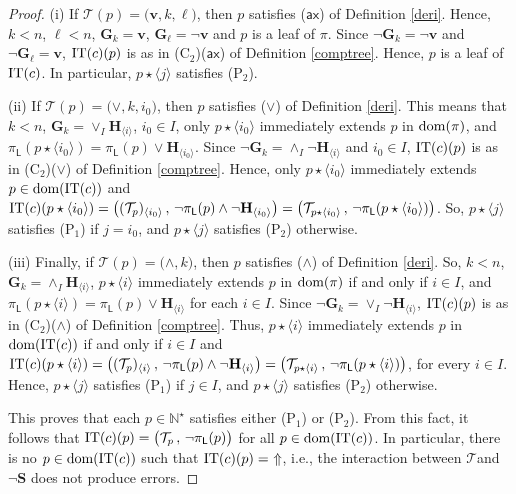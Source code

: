 \documentclass[copyright,creativecommons]{eptcs}
\def\ie{i.e., }
\newcommand{\vv}{\langle}
\newcommand{\ww}{\rangle}
\newcommand{\NN}{\mathbb{N}}
\newcommand{\axi}{\mathsf{ax}}
\newcommand{\cT}{\mathcal{T}}
\newcommand{\Dis}[1]{\big( #1 \big)}
\newcommand{\arppp}[2]{\textstyle\vee_{#2} \bH_{#1}}
\newcommand{\arnnn}[2]{\textstyle\wedge_{#2} \bH_{#1}}
\newcommand{\bG}{\mathbf{G}}
\newcommand{\bH}{\mathbf{H}}
\newcommand{\bS}{\mathbf{S}}
\newcommand{\bbv}{\mathbf{v}}
\newcommand{\dom}{\ensuremath{\textnormal{dom}}}
\newcommand{\CT}{\textnormal{IT}}
\newcommand{\sL}{\mathsf{L}}
\theoremstyle{definition}
\begin{document}
\begin{proof}
(i) If  $\cT(p) = \Dis{\bbv , k , \ell}$,
then $p$ satisfies
 ($\axi$) of Definition
\ref{deri}.
 Hence, $k<n$, $\ell < n$,
 $ \bG_k = \bbv$,
 $\bG_\ell = \neg \bbv$ and
  $p$ is a leaf of $\pi$. Since  $\neg \bG_k = \neg \bbv$ and
 $\neg \bG_\ell = \bbv$,   $\CT(c)(p)$
is as in (C$_2$)($\axi$)
 of Definition \ref{comptree}.  Hence,
$p$ is  a  leaf of
  $\CT(c)$. In particular,
$p \star \vv j \ww$ satisfies (P$_2$).



(ii) If $\cT(p) = \Dis{\vee , k , i_0}$, then  $p$
satisfies   ($\vee$) of Definition
\ref{deri}. This means that $ k < n$,
 $\bG_k = \arppp{\vv i \ww}{I}$, $i_0 \in I$,
 only $p \star \vv i_0 \ww$ immediately extends $ p$ in $\dom(\pi)$,
 and $\pi_\sL(p \star \vv i_0 \ww) =
  \pi_\sL(p) \vee \bH_{\vv i_0 \ww}$.
Since   $\neg \bG_k = \wedge_{I} \neg\bH_{\vv i \ww}$ and $i_0 \in I$,     $\CT(c)(p)$
is as in (C$_2$)($\vee$)
 of Definition \ref{comptree}. Hence, only $p \star \vv i_0 \ww$ immediately extends $ p \in \dom(\CT(c))$
 and $\CT(c)(p \star \vv i_0 \ww) = \big( (\cT_p)_{\vv i_0 \ww} \, , \,
 \neg \pi_\sL(p) \wedge \neg \bH_{\vv i_0 \ww}
   \big) =
   \big( \cT_{p\star \vv i_0 \ww} \, , \,
 \neg\pi_\sL(p \star \vv i_0 \ww)
   \big)
   $. So, $p \star \vv  j\ww$ satisfies (P$_1$) if $ j = i_0$, and  $p \star \vv  j\ww$ satisfies (P$_2$) otherwise.



 (iii) Finally, if  $\cT(p) = \Dis{\wedge , k}$,
then $p$ satisfies
 ($\wedge$) of Definition
\ref{deri}. So,
 $ k < n$,
 $ \bG_k = \arnnn{\vv i \ww}{I}$,
$p \star \vv i \ww$ immediately extends $ p$ in $\dom(\pi)$ if and only if $i \in I$,
 and $\pi_\sL(p \star \vv i \ww) =
  \pi_\sL(p) \vee \bH_{\vv i \ww}$
  for each $i \in I$.
Since   $\neg \bG_k = \vee_{I} \neg\bH_{\vv i \ww}$,  $\CT(c)(p)$
is as in   (C$_2$)($\wedge$)
 of Definition \ref{comptree}.  Thus,
$p \star \vv i \ww$ immediately extends $ p$ in  $\dom(\CT(c))$ if and only if
$i \in I$
 and $\CT(c)(p \star \vv i \ww) = \big( (\cT_p)_{\vv i \ww} \, , \,
 \neg   \pi_\sL(p) \wedge \neg \bH_{\vv i \ww}
   \big) =
   \big( \cT_{p\star \vv i \ww} \, , \,
 \neg\pi_\sL(p \star \vv i \ww)
   \big)
   $, for every $i \in I$.
Hence, $p \star \vv  j\ww$ satisfies (P$_1$) if $ j \in I $, and  $p \star \vv  j\ww$ satisfies (P$_2$) otherwise.



This proves that  each $p \in \NN^\star$ satisfies
either  (P$_1$) or (P$_2$).
From  this fact, it follows that
$\CT(c)(p) =
\big( \cT_p  \, , \, \neg \pi_\sL(p) \big)$ for all $p \in\dom(\CT(c))$.
In particular, there  is no $p \in \dom(\CT(c))$
such that $\CT(c)(p) = \ \Uparrow$, \ie the interaction between \/$\cT$\@ and  \/$\neg \bS$\@
 does not produce errors.


\end{proof}
\end{document}
